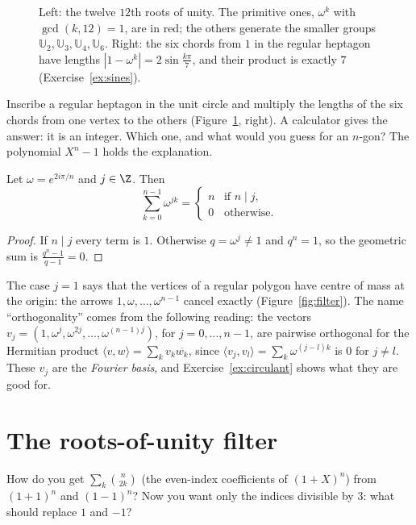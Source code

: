 \begin{figure}[ht]
\centering
{}
\caption{Left: the twelve $12$th roots of unity. The primitive ones, $\omega^k$ with $\gcd(k,12)=1$, are in red; the others generate the smaller groups $\mathbb U_2,\mathbb U_3,\mathbb U_4,\mathbb U_6$. Right: the six chords from $1$ in the regular heptagon have lengths $|1-\omega^k|=2\sin\frac{k\pi}7$, and their product is exactly $7$ (Exercise~\ref{ex:sines}).}
\label{fig:roots}
\end{figure}

\begin{think}
Inscribe a regular heptagon in the unit circle and multiply the lengths of the six chords from one vertex to the others (Figure~\ref{fig:roots}, right). A calculator gives the answer: it is an integer. Which one, and what would you guess for an $n$-gon? The polynomial $X^n-1$ holds the explanation.
\end{think}

\begin{proposition}[orthogonality]\label{prop:orth}
Let $\omega=e^{2i\pi/n}$ and $j\in\Z$. Then
\[
\sum_{k=0}^{n-1}\omega^{jk}=\begin{cases}n&\text{if }n\mid j,\\0&\text{otherwise.}\end{cases}
\]
\end{proposition}
\begin{proof}
If $n\mid j$ every term is $1$. Otherwise $q=\omega^j\ne1$ and $q^n=1$, so the geometric sum is $\frac{q^n-1}{q-1}=0$.
\end{proof}

The case $j=1$ says that the vertices of a regular polygon have centre of mass at the origin: the arrows $1,\omega,\dots,\omega^{n-1}$ cancel exactly
(Figure~\ref{fig:filter}). The name ``orthogonality'' comes from the following reading: the vectors $v_j=(1,\omega^j,\omega^{2j},\dots,\omega^{(n-1)j})$, for
$j=0,\dots,n-1$, are pairwise orthogonal for the Hermitian product $\langle v,w\rangle=\sum_kv_k\overline{w_k}$, since $\langle v_j,v_l\rangle=\sum_k\omega^{(j-l)k}$ is $0$ for $j\ne l$.
These $v_j$ are the \emph{Fourier basis}, and Exercise~\ref{ex:circulant} shows what they are good for.

\section{The roots-of-unity filter}

\begin{think}
How do you get $\sum_k\binom n{2k}$ (the even-index coefficients of $(1+X)^n$) from $(1+1)^n$ and $(1-1)^n$? Now you want only the indices divisible by $3$: what should replace $1$ and $-1$?
\end{think}

